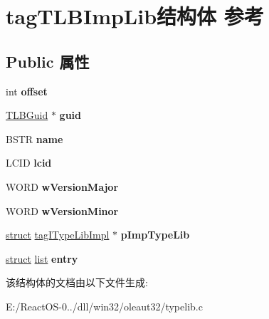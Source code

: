\hypertarget{structtag_t_l_b_imp_lib}{}\section{tag\+T\+L\+B\+Imp\+Lib结构体 参考}
\label{structtag_t_l_b_imp_lib}
\subsection*{Public 属性}
\begin{DoxyCompactItemize}
\item 
\mbox{\label{structtag_t_l_b_imp_lib_ab1538ac0f64d4e690787ea19ff42f4ad}} 
int {\bfseries offset}
\item 
\mbox{\label{structtag_t_l_b_imp_lib_a00c56ce017b653dddf412043bca0b630}} 
\hyperlink{structtag_t_l_b_guid}{T\+L\+B\+Guid} $\ast$ {\bfseries guid}
\item 
\mbox{\label{structtag_t_l_b_imp_lib_ae9a2e4313ac4fa51869e3ea118622ac8}} 
B\+S\+TR {\bfseries name}
\item 
\mbox{\label{structtag_t_l_b_imp_lib_a5de8e9e190acae27516e3c42815aac99}} 
L\+C\+ID {\bfseries lcid}
\item 
\mbox{\label{structtag_t_l_b_imp_lib_af4f01941ce44acd96fb607565cd23ba4}} 
W\+O\+RD {\bfseries w\+Version\+Major}
\item 
\mbox{\label{structtag_t_l_b_imp_lib_af07fdfec7cbb86123c678758d28f52e0}} 
W\+O\+RD {\bfseries w\+Version\+Minor}
\item 
\mbox{\label{structtag_t_l_b_imp_lib_ad16fdf745e1a86b2cf6d6cfb809493af}} 
\hyperlink{interfacestruct}{struct} \hyperlink{structtag_i_type_lib_impl}{tag\+I\+Type\+Lib\+Impl} $\ast$ {\bfseries p\+Imp\+Type\+Lib}
\item 
\mbox{\label{structtag_t_l_b_imp_lib_afcda3899e0345a5338a0e4118d22c76a}} 
\hyperlink{interfacestruct}{struct} \hyperlink{classlist}{list} {\bfseries entry}
\end{DoxyCompactItemize}


该结构体的文档由以下文件生成\+:\begin{DoxyCompactItemize}
\item 
E\+:/\+React\+O\+S-\/0../dll/win32/oleaut32/typelib.\+c\end{DoxyCompactItemize}

